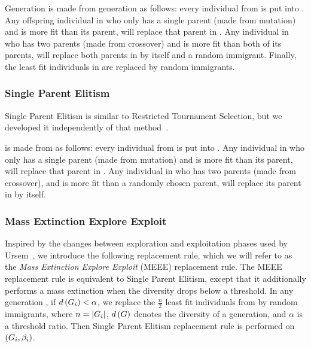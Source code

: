 Generation  is made from generation  as follows: every individual from  is put into . Any offspring individual in  who only has a single parent (made from mutation) and is more fit than its parent, will replace that parent in . Any individual in  who has two parents (made from crossover) and is more fit than both of its parents, will replace both parents in  by itself and a random immigrant. Finally, the  least fit individuals in  are replaced by random immigrants.

\subsubsection{Single Parent Elitism}
Single Parent Elitism is similar to Restricted Tournament Selection, but we developed it independently of that method~\cite[p.\ 132]{Luke2013Metaheuristics}.

 is made from  as follows: every individual from  is put into . Any individual in  who only has a single parent (made from mutation) and is more fit than its parent, will replace that parent in . Any individual in  who has two parents (made from crossover), and is more fit than a randomly chosen parent, will replace its parent in  by itself.

\subsubsection{Mass Extinction Explore Exploit}
Inspired by the changes between exploration and exploitation phases used by Ursem~\cite{ursem2002diversity}, we introduce the following replacement rule, which we will refer to as the \emph{Mass Extinction Explore Exploit} (MEEE) replacement rule. The MEEE replacement rule is equivalent to Single Parent Elitism, except that it additionally performs a mass extinction when the diversity drops below a threshold. In any generation , if $d\left(G_{i}\right) < \alpha$, we replace the $\tfrac{n}{2}$ least fit individuals from  by random immigrants, where $n = \lvert G_{i}\rvert$, $d\left(G\right)$ denotes the diversity of a generation, and $\alpha$ is a threshold ratio. Then Single Parent Elitism replacement rule is performed on $\left(G_{i}, \beta_{i}\right)$.

